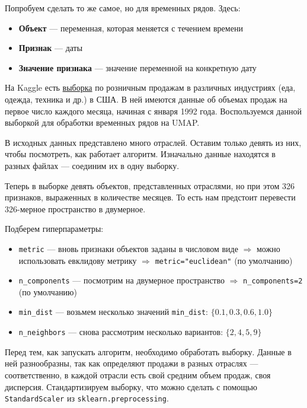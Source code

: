 \graphicspath{{chapters/time-series/}}
Попробуем сделать то же самое, но для временных рядов. Здесь:
\begin{itemize}
	\item \textbf{Объект} --- переменная, которая меняется с течением времени
	\item \textbf{Признак} --- даты
	\item \textbf{Значение признака} --- значение переменной на конкретную дату
\end{itemize}

На Kaggle есть \href{https://www.kaggle.com/census/advance-retail-sales-time-series-collection}{выборка} по розничным продажам в различных индустриях (еда, одежда, техника и др.) в США. В ней имеются данные об объемах продаж на первое число каждого месяца, начиная с января 1992 года. Воспользуемся данной выборкой для обработки временных рядов на UMAP.

В исходных данных представлено много отраслей. Оставим только девять из них, чтобы посмотреть, как работает алгоритм. Изначально данные находятся в разных файлах --- соединим их в одну выборку.

Теперь в выборке девять объектов, представленных отраслями, но при этом 326 признаков, выраженных в количестве месяцев. То есть нам предстоит перевести 326-мерное пространство в двумерное.

Подберем гиперпараметры:
\begin{itemize}
	\item \verb|metric| --- вновь признаки объектов заданы в числовом виде $\Rightarrow$ можно использовать евклидову метрику $\Rightarrow$ \verb|metric="euclidean"| (по умолчанию)
	\item \verb|n_components| --- посмотрим на двумерное пространство $\Rightarrow$ \verb|n_components=2| (по умолчанию)
	\item \verb|min_dist| --- возьмем несколько значений \verb|min_dist|: $\{0.1, 0.3, 0.6, 1.0\}$
	\item \verb|n_neighbors| --- снова рассмотрим несколько вариантов: $\{2, 4, 5, 9\}$
\end{itemize}

Перед тем, как запускать алгоритм, необходимо обработать выборку. Данные в ней разнообразны, так как определяют продажи в разных отраслях --- соответственно, в каждой отрасли есть свой средним объем продаж, своя дисперсия. Стандартизируем выборку, что можно сделать с помощью \verb|StandardScaler| из \verb|sklearn.preprocessing|.

